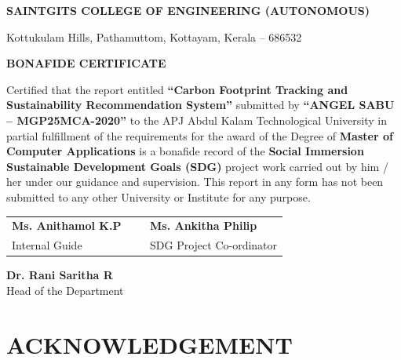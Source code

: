 \documentclass[12pt,a4paper]{report}
\begin{document}
\setcounter{page}{2}

\clearpage
\begin{center}
    {\bfseries\large SAINTGITS COLLEGE OF ENGINEERING (AUTONOMOUS) \par}
    {\small Kottukulam Hills, Pathamuttom, Kottayam, Kerala -- 686532 \par}
    \vspace{1.2cm}
    {\bfseries\Large BONAFIDE CERTIFICATE \par}
\end{center}
\vspace{1.0cm}

Certified that the report entitled \textbf{``Carbon Footprint Tracking and Sustainability Recommendation System''} submitted by \textbf{``ANGEL SABU -- MGP25MCA-2020''} to the APJ Abdul Kalam Technological University in partial fulfillment of the requirements for the award of the Degree of \textbf{Master of Computer Applications} is a bonafide record of the \textbf{Social Immersion Sustainable Development Goals (SDG)} project work carried out by him / her under our guidance and supervision. This report in any form has not been submitted to any other University or Institute for any purpose.

\vspace{3.5cm}

\noindent
\begin{tabular}{@{}p{0.5\linewidth}p{0.5\linewidth}@{}}
\textbf{Ms. Anithamol K.P} & \hfill \textbf{Ms. Ankitha Philip} \\
Internal Guide & \hfill SDG Project Co-ordinator \\
\end{tabular}

\vspace{3.0cm}

\begin{center}
\textbf{Dr. Rani Saritha R} \\
Head of the Department
\end{center}

\clearpage
\chapter*{ACKNOWLEDGEMENT}
\end{document}
